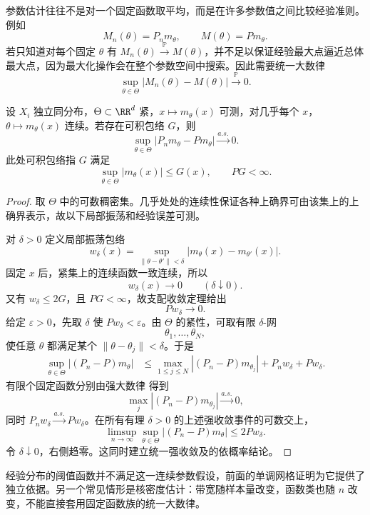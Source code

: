 参数估计往往不是对一个固定函数取平均，而是在许多参数值之间比较经验准则。例如
\[
 M_n(\theta)=P_nm_\theta,
 \qquad
 M(\theta)=Pm_\theta.
\]
若只知道对每个固定 $\theta$ 有 $M_n(\theta)\xrightarrow{\mathbb P} M(\theta)$，并不足以保证经验最大点逼近总体最大点，因为最大化操作会在整个参数空间中搜索。因此需要统一大数律
\begin{equation}\label{eq:math-stat-ulln}
 \sup_{\theta\in\Theta}|M_n(\theta)-M(\theta)|\xrightarrow{\mathbb P}0.
\end{equation}
\begin{theorem}[紧参数空间上的统一强大数律]
设 $X_i$ 独立同分布，$\Theta\subset\RR^d$ 紧，$x\mapsto m_\theta(x)$ 可测，对几乎每个 $x$，$\theta\mapsto m_\theta(x)$ 连续。若存在可积包络 $G$，则
\[
 \sup_{\theta\in\Theta}|P_nm_\theta-Pm_\theta|\xrightarrow{a.s.}0.
\]
此处可积包络指 $G$ 满足
\[
 \sup_{\theta\in\Theta}|m_\theta(x)|\le G(x),
 \qquad
 PG<\infty.
\]
\end{theorem}
\begin{proof}
取 $\Theta$ 中的可数稠密集。几乎处处的连续性保证各种上确界可由该集上的上确界表示，故以下局部振荡和经验误差可测。

对 $\delta>0$ 定义局部振荡包络
\[
 w_\delta(x)
 =\sup_{\|\theta-\theta'\|<\delta}
 |m_\theta(x)-m_{\theta'}(x)|.
\]
固定 $x$ 后，紧集上的连续函数一致连续，所以
\[
 w_\delta(x)\to0
 \qquad(\delta\downarrow0).
\]
又有 $w_\delta\le2G$，且 $PG<\infty$，故支配收敛定理给出
\[
 Pw_\delta\to0.
\]
给定 $\varepsilon>0$，先取 $\delta$ 使 $Pw_\delta<\varepsilon$。由 $\Theta$ 的紧性，可取有限 $\delta$-网
\[
 \theta_1,\ldots,\theta_N,
\]
使任意 $\theta$ 都满足某个 $\|\theta-\theta_j\|<\delta$。于是
\begin{align*}
 \sup_{\theta\in\Theta}
 |(P_n-P)m_\theta|
 &\le
 \max_{1\le j\le N}|(P_n-P)m_{\theta_j}|
 +P_nw_\delta+Pw_\delta.
\end{align*}
有限个固定函数分别由强大数律 得到
\[
 \max_j|(P_n-P)m_{\theta_j}|\xrightarrow{a.s.}0,
\]
同时 $P_nw_\delta\xrightarrow{a.s.} Pw_\delta$。在所有有理 $\delta>0$ 的上述强收敛事件的可数交上，
\[
 \limsup_{n\to\infty}\sup_{\theta\in\Theta}|(P_n-P)m_\theta|
 \le2Pw_\delta.
\]
令 $\delta\downarrow0$，右侧趋零。这同时建立统一强收敛及的依概率结论。
\end{proof}

经验分布的阈值函数并不满足这一连续参数假设，前面的单调网格证明为它提供了独立依据。另一个常见情形是核密度估计：带宽随样本量改变，函数类也随 $n$ 改变，不能直接套用固定函数族的统一大数律。

